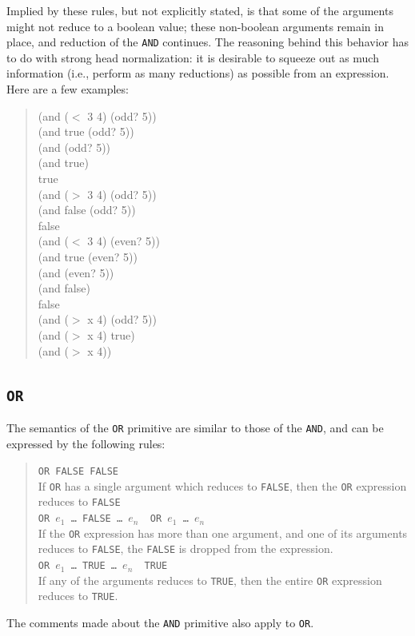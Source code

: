 	Implied by these rules, but not explicitly stated, is that some of the
arguments might not reduce to a boolean value; these non-boolean
arguments remain in place, and reduction of the {\tt AND} continues.	
The reasoning behind this behavior has to do with strong head normalization: 
it is desirable to squeeze out as much information (i.e., perform as
many reductions) as possible from an expression.  Here are a few examples:
\begin{quote}
\begin{tt}
(and ($<$ 3 4) (odd? 5)) \reds\\ 
(and true (odd? 5)) \reds\\ 
(and (odd? 5)) \reds\\
(and true) \reds\\
true\\[.10in]
(and ($>$ 3 4) (odd? 5)) \reds\\  
(and false (odd? 5)) \reds\\
false\\[.10 in]
(and ($<$ 3 4) (even? 5)) \reds\\ 
(and true (even? 5)) \reds\\ 
(and (even? 5)) \reds\\
(and false) \reds\\
false\\[.10in]
(and ($>$ x 4) (odd? 5)) \reds\\
(and ($>$ x 4) true) \reds\\
(and ($>$ x 4))
\end{tt}
\end{quote}


\subsection{\tt OR}

	The semantics of the {\tt OR} primitive are similar to those of the
{\tt AND}, and can be expressed by the
following rules:
\begin{quote}
	{\tt OR FALSE\reds\  FALSE}\\
		 If {\tt OR} has a single argument which
reduces to {\tt FALSE}, then the {\tt OR} expression reduces to
{\tt FALSE}\\[.10in]
	{\tt OR $e_1$ \ldots\ FALSE \ldots\ $e_n$ \reds\  OR $e_1$ \ldots\ $e_n$
}\\
		If the {\tt OR} expression has more than one argument, and one of
its arguments reduces to {\tt FALSE}, the {\tt FALSE} is dropped from the
expression.\\[.10in]
	{\tt OR $e_1$ \ldots\ TRUE \ldots\ $e_n$ \reds\  TRUE}\\
	  If any of the arguments reduces to {\tt TRUE}, then the entire {\tt OR}
expression reduces to {\tt TRUE}.
\end{quote}
The comments made about the {\tt AND} primitive also apply to {\tt OR}.

